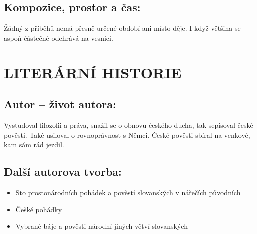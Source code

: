 \documentclass{extarticle} %
\begin{document}
\subsection*{Kompozice, prostor a čas:}
\noindent 
Žádný z příběhů nemá přesně určené období ani místo děje. I když většina se aspoň částečně odehrává na vesnici.


\section*{LITERÁRNÍ HISTORIE}





\subsection*{Autor {\ssmall -- život autora:}}
\noindent 
Vystudoval filozofii a práva, snažil se o obnovu českého ducha, tak sepisoval české pověsti. Také usiloval o rovnoprávnost s Němci. České pověsti sbíral na venkově, kam sám rád jezdil.


\subsection*{Další autorova tvorba:}
\noindent 
\begin{itemize}
    \item Sto prostonárodních pohádek a pověstí slovanských v nářečích původních
    \item Češké pohádky
    \item Vybrané báje a pověsti národní jiných větví slovanských
\end{itemize}
\end{document}
